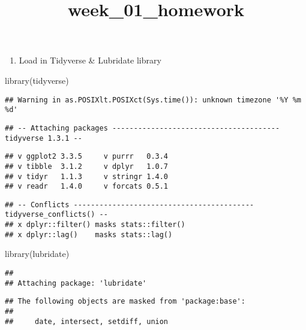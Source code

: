 \documentclass[
]{article}
\title{week\_01\_homework}
\author{}
\date{\vspace{-2.5em}}
\newenvironment{Shaded}{\begin{snugshade}}{\end{snugshade}}
\newcommand{\FunctionTok}[1]{\textcolor[rgb]{0.00,0.00,0.00}{#1}}
\newcommand{\NormalTok}[1]{#1}
\providecommand{\tightlist}{%
  \setlength{\itemsep}{0pt}\setlength{\parskip}{0pt}}
\begin{document}
\maketitle

\begin{enumerate}
\def\labelenumi{\arabic{enumi}.}
\tightlist
\item
  Load in Tidyverse \& Lubridate library
\end{enumerate}

\begin{Shaded}
\begin{Highlighting}[]
\FunctionTok{library}\NormalTok{(tidyverse)}
\end{Highlighting}
\end{Shaded}

\begin{verbatim}
## Warning in as.POSIXlt.POSIXct(Sys.time()): unknown timezone '%Y %m %d'
\end{verbatim}

\begin{verbatim}
## -- Attaching packages --------------------------------------- tidyverse 1.3.1 --
\end{verbatim}

\begin{verbatim}
## v ggplot2 3.3.5     v purrr   0.3.4
## v tibble  3.1.2     v dplyr   1.0.7
## v tidyr   1.1.3     v stringr 1.4.0
## v readr   1.4.0     v forcats 0.5.1
\end{verbatim}

\begin{verbatim}
## -- Conflicts ------------------------------------------ tidyverse_conflicts() --
## x dplyr::filter() masks stats::filter()
## x dplyr::lag()    masks stats::lag()
\end{verbatim}

\begin{Shaded}
\begin{Highlighting}[]
\FunctionTok{library}\NormalTok{(lubridate)}
\end{Highlighting}
\end{Shaded}

\begin{verbatim}
## 
## Attaching package: 'lubridate'
\end{verbatim}

\begin{verbatim}
## The following objects are masked from 'package:base':
## 
##     date, intersect, setdiff, union
\end{verbatim}
\end{document}
